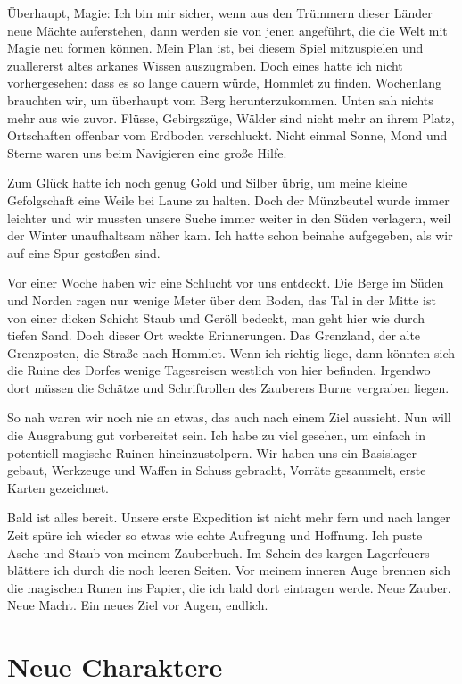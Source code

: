 \documentclass[11pt]{wbzine}
\begin{document}
\begin{multicols}{2}
Überhaupt, Magie: Ich bin mir sicher, wenn aus den Trümmern dieser
Länder neue Mächte auferstehen, dann werden sie von jenen angeführt,
die die Welt mit Magie neu formen können. Mein Plan ist, bei diesem
Spiel mitzuspielen und zuallererst altes arkanes Wissen auszugraben.
Doch eines hatte ich nicht vorhergesehen: dass es so lange dauern
würde, Hommlet zu finden. Wochenlang brauchten wir, um überhaupt vom
Berg herunterzukommen. Unten sah nichts mehr aus wie zuvor. Flüsse,
Gebirgszüge, Wälder sind nicht mehr an ihrem Platz, Ortschaften
offenbar vom Erdboden verschluckt. Nicht einmal Sonne, Mond und
Sterne waren uns beim Navigieren eine große Hilfe.

Zum Glück hatte ich noch genug Gold und Silber übrig, um meine
kleine Gefolgschaft eine Weile bei Laune zu halten. Doch der
Münzbeutel wurde immer leichter und wir mussten unsere Suche immer
weiter in den Süden verlagern, weil der Winter unaufhaltsam näher
kam. Ich hatte schon beinahe aufgegeben, als wir auf eine Spur
gestoßen sind.

Vor einer Woche haben wir eine Schlucht vor uns entdeckt. Die Berge
im Süden und Norden ragen nur wenige Meter über dem Boden, das Tal
in der Mitte ist von einer dicken Schicht Staub und Geröll bedeckt,
man geht hier wie durch tiefen Sand. Doch dieser Ort weckte
Erinnerungen. Das Grenzland, der alte Grenzposten, die Straße nach
Hommlet. Wenn ich richtig liege, dann könnten sich die Ruine des
Dorfes wenige Tagesreisen westlich von hier befinden. Irgendwo dort
müssen die Schätze und Schriftrollen des Zauberers Burne vergraben
liegen. 

So nah waren wir noch nie an etwas, das auch nach einem Ziel
aussieht. Nun will die Ausgrabung gut vorbereitet sein. Ich habe zu
viel gesehen, um einfach in potentiell magische Ruinen
hineinzustolpern. Wir haben uns ein Basislager gebaut, Werkzeuge und
Waffen in Schuss gebracht, Vorräte gesammelt, erste Karten
gezeichnet.

Bald ist alles bereit. Unsere erste Expedition ist nicht mehr fern
und nach langer Zeit spüre ich wieder so etwas wie echte Aufregung
und Hoffnung. Ich puste Asche und Staub von meinem Zauberbuch. Im
Schein des kargen Lagerfeuers blättere ich durch die noch leeren
Seiten. Vor meinem inneren Auge brennen sich die magischen Runen ins
Papier, die ich bald dort eintragen werde. Neue Zauber. Neue Macht.
Ein neues Ziel vor Augen, endlich.

\section{Neue Charaktere}


\end{multicols}
\end{document}
